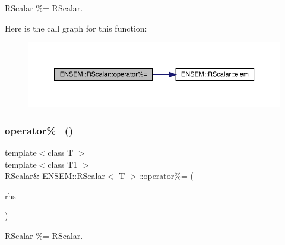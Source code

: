 \mbox{\hyperlink{classENSEM_1_1RScalar}{R\+Scalar}} \%= \mbox{\hyperlink{classENSEM_1_1RScalar}{R\+Scalar}}. 

Here is the call graph for this function\+:
\nopagebreak
\begin{figure}[H]
\begin{center}
\leavevmode
\includegraphics[width=350pt]{d0/d8c/classENSEM_1_1RScalar_ac5ab25042d679a621ccb42d13fb3b441_cgraph}
\end{center}
\end{figure}
\mbox{\label{classENSEM_1_1RScalar_ac5ab25042d679a621ccb42d13fb3b441}} 
\subsubsection{\texorpdfstring{operator\%=()}{operator\%=()}\hspace{0.1cm}{\footnotesize\ttfamily [2/3]}}
{\footnotesize\ttfamily template$<$class T $>$ \\
template$<$class T1 $>$ \\
\mbox{\hyperlink{classENSEM_1_1RScalar}{R\+Scalar}}\& \mbox{\hyperlink{classENSEM_1_1RScalar}{E\+N\+S\+E\+M\+::\+R\+Scalar}}$<$ T $>$\+::operator\%= (\begin{DoxyParamCaption}\item[{const \mbox{\hyperlink{classENSEM_1_1RScalar}{R\+Scalar}}$<$ T1 $>$ \&}]{rhs }\end{DoxyParamCaption})\hspace{0.3cm}{\ttfamily [inline]}}



\mbox{\hyperlink{classENSEM_1_1RScalar}{R\+Scalar}} \%= \mbox{\hyperlink{classENSEM_1_1RScalar}{R\+Scalar}}. 

